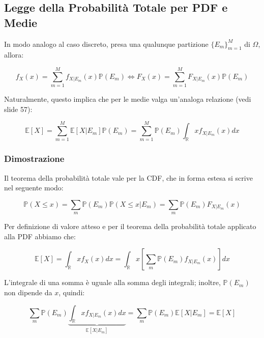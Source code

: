 \subsection{Legge della Probabilità Totale per PDF e Medie}

In modo analogo al caso discreto, presa una qualunque partizione $\{E_m\}_{m=1}^M$ di $\Omega$, allora:

\begin{equation}
f_X(x) = \sum_{m=1}^{M} f_{X|E_m}(x)\mathbb{P}(E_m) \iff F_X(x) = \sum_{m=1}^{M} F_{X|E_m}(x)\mathbb{P}(E_m)
\end{equation}

Naturalmente, questo implica che per le medie valga un'analoga relazione (vedi slide 57):

\begin{equation}
\mathbb{E}[X] = \sum_{m=1}^{M} \mathbb{E}[X|E_m]\mathbb{P}(E_m) = \sum_{m=1}^{M} \mathbb{P}(E_m) \int_{\mathbb{R}} x f_{X|E_m}(x) dx
\end{equation}

\subsubsection*{Dimostrazione}

Il teorema della probabilità totale vale per la CDF, che in forma estesa si scrive nel seguente modo:

\begin{equation}
\mathbb{P}(X \le x) = \sum_m \mathbb{P}(E_m) \mathbb{P}(X \le x | E_m) = \sum_m \mathbb{P}(E_m) F_{X|E_m}(x)
\end{equation}

Per definizione di valore atteso e per il teorema della probabilità totale applicato alla PDF abbiamo che:

\begin{equation}
\mathbb{E}[X] = \int_{\mathbb{R}} x f_X(x) dx = \int_{\mathbb{R}} x \left[ \sum_m \mathbb{P}(E_m) f_{X|E_m}(x) \right] dx
\end{equation}

L'integrale di una somma è uguale alla somma degli integrali; inoltre, $\mathbb{P}(E_m)$ non dipende da $x$, quindi:

\begin{equation}
\sum_m \mathbb{P}(E_m) \underbrace{\int_{\mathbb{R}} x f_{X|E_m}(x) dx}_{\mathbb{E}[X|E_m]} = \sum_m \mathbb{P}(E_m) \mathbb{E}[X|E_m] = \mathbb{E}[X]
\end{equation}


